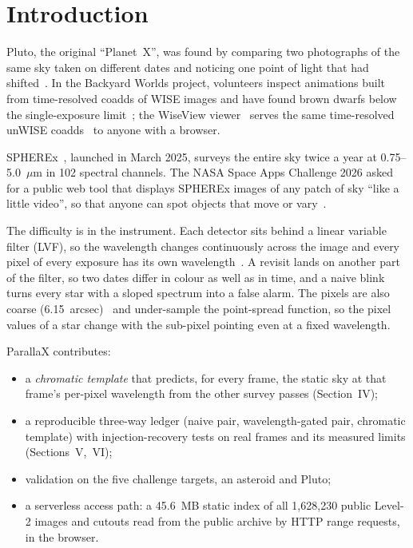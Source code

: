 \documentclass[conference]{IEEEtran}
\begin{document}
\section{Introduction}

Pluto, the original ``Planet~X'', was found by comparing two photographs of the same sky taken on different dates and noticing one point of light that had shifted~\cite{spaceapps2026}. In the Backyard Worlds project, volunteers inspect animations built from time-resolved coadds of WISE images and have found brown dwarfs below the single-exposure limit~\cite{kuchner2017}; the WiseView viewer~\cite{caselden2018} serves the same time-resolved unWISE coadds~\cite{meisner2018coadds} to anyone with a browser.

SPHEREx~\cite{bock2026}, launched in March 2025, surveys the entire sky twice a year at 0.75--5.0~$\mu$m in 102 spectral channels. The NASA Space Apps Challenge 2026 asked for a public web tool that displays SPHEREx images of any patch of sky ``like a little video'', so that anyone can spot objects that move or vary~\cite{spaceapps2026}.

The difficulty is in the instrument. Each detector sits behind a linear variable filter (LVF), so the wavelength changes continuously across the image and every pixel of every exposure has its own wavelength~\cite{bock2026,akeson2026}. A revisit lands on another part of the filter, so two dates differ in colour as well as in time, and a naive blink turns every star with a sloped spectrum into a false alarm. The pixels are also coarse (6.15~arcsec)~\cite{expsupp2026} and under-sample the point-spread function, so the pixel values of a star change with the sub-pixel pointing even at a fixed wavelength.

ParallaX contributes:

\begin{itemize}
\item a \emph{chromatic template} that predicts, for every frame, the static sky at that frame's per-pixel wavelength from the other survey passes (Section~IV);
\item a reproducible three-way ledger (naive pair, wavelength-gated pair, chromatic template) with injection-recovery tests on real frames and its measured limits (Sections~V,~VI);
\item validation on the five challenge targets, an asteroid and Pluto;
\item a serverless access path: a 45.6~MB static index of all 1,628,230 public Level-2 images and cutouts read from the public archive by HTTP range requests, in the browser.
\end{itemize}
\end{document}
